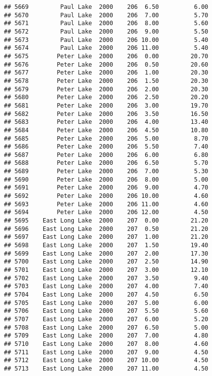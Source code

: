 \documentclass[
]{article}
\begin{document}
\begin{verbatim}
## 5669         Paul Lake  2000    206  6.50          6.00
## 5670         Paul Lake  2000    206  7.00          5.70
## 5671         Paul Lake  2000    206  8.00          5.60
## 5672         Paul Lake  2000    206  9.00          5.50
## 5673         Paul Lake  2000    206 10.00          5.40
## 5674         Paul Lake  2000    206 11.00          5.40
## 5675        Peter Lake  2000    206  0.00         20.70
## 5676        Peter Lake  2000    206  0.50         20.60
## 5677        Peter Lake  2000    206  1.00         20.30
## 5678        Peter Lake  2000    206  1.50         20.30
## 5679        Peter Lake  2000    206  2.00         20.30
## 5680        Peter Lake  2000    206  2.50         20.20
## 5681        Peter Lake  2000    206  3.00         19.70
## 5682        Peter Lake  2000    206  3.50         16.50
## 5683        Peter Lake  2000    206  4.00         13.40
## 5684        Peter Lake  2000    206  4.50         10.80
## 5685        Peter Lake  2000    206  5.00          8.70
## 5686        Peter Lake  2000    206  5.50          7.40
## 5687        Peter Lake  2000    206  6.00          6.80
## 5688        Peter Lake  2000    206  6.50          5.70
## 5689        Peter Lake  2000    206  7.00          5.30
## 5690        Peter Lake  2000    206  8.00          5.00
## 5691        Peter Lake  2000    206  9.00          4.70
## 5692        Peter Lake  2000    206 10.00          4.60
## 5693        Peter Lake  2000    206 11.00          4.60
## 5694        Peter Lake  2000    206 12.00          4.50
## 5695    East Long Lake  2000    207  0.00         21.20
## 5696    East Long Lake  2000    207  0.50         21.20
## 5697    East Long Lake  2000    207  1.00         21.20
## 5698    East Long Lake  2000    207  1.50         19.40
## 5699    East Long Lake  2000    207  2.00         17.30
## 5700    East Long Lake  2000    207  2.50         14.90
## 5701    East Long Lake  2000    207  3.00         12.10
## 5702    East Long Lake  2000    207  3.50          9.40
## 5703    East Long Lake  2000    207  4.00          7.40
## 5704    East Long Lake  2000    207  4.50          6.50
## 5705    East Long Lake  2000    207  5.00          6.00
## 5706    East Long Lake  2000    207  5.50          5.60
## 5707    East Long Lake  2000    207  6.00          5.20
## 5708    East Long Lake  2000    207  6.50          5.00
## 5709    East Long Lake  2000    207  7.00          4.80
## 5710    East Long Lake  2000    207  8.00          4.60
## 5711    East Long Lake  2000    207  9.00          4.50
## 5712    East Long Lake  2000    207 10.00          4.50
## 5713    East Long Lake  2000    207 11.00          4.50

\end{verbatim}
\end{document}
